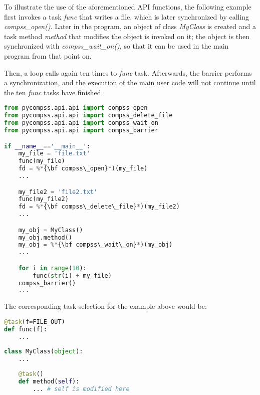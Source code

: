 To illustrate the use of the aforementioned API functions, the following example first invokes a task 
{\it func} that writes a file, which is later synchronized by calling {\it compss\_open()}. 
Later in the program, an object of class {\it MyClass} is created and a task method {\it method} 
that modifies the object is invoked on it; the object is then synchronized with {\it compss\_wait\_on()}, 
so that it can be used in the main program from that point on.

Then, a loop calls again ten times to {\it func} task.
Afterwards, the barrier performs a synchronization, and the execution of the main user code will
not continue until the ten {\it func} tasks have finished.

\begin{lstlisting}[language=python]
from pycompss.api.api import compss_open
from pycompss.api.api import compss_delete_file
from pycompss.api.api import compss_wait_on
from pycompss.api.api import compss_barrier

if __name__=='__main__':
    my_file = 'file.txt'
    func(my_file)
    fd = %*{\bf compss\_open}*)(my_file)
    ...

    my_file2 = 'file2.txt'
    func(my_file2)
    fd = %*{\bf compss\_delete\_file}*)(my_file2)
    ...

    my_obj = MyClass()
    my_obj.method()
    my_obj = %*{\bf compss\_wait\_on}*)(my_obj)
    ...

    for i in range(10):
        func(str(i) + my_file)
    compss_barrier()
    ...
\end{lstlisting}

The corresponding task selection for the example above would be:

\begin{lstlisting}[language=python]
@task(f=FILE_OUT)
def func(f):
    ...
    
class MyClass(object):
    ...
    
    @task()
    def method(self):
        ... # self is modified here
\end{lstlisting}


